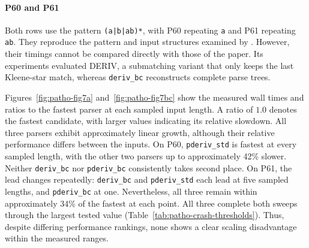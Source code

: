 %
%
%



\paragraph{P60 and P61}
Both rows use the pattern \texttt{(a|b|ab)*},
with P60 repeating \texttt{a} and P61 repeating \texttt{ab}.
They reproduce the pattern and input structures
examined by \citet[Figs.~7(a) and 7(b)]{sulzmannlu2014}.
However, their timings cannot be compared directly
with those of the paper.
Its experiments evaluated DERIV, a submatching variant
that only keeps the last Kleene-star match,
whereas \texttt{deriv\_bc} reconstructs complete parse trees.

Figures~\ref{fig:patho-fig7a}
and~\ref{fig:patho-fig7bc} show the measured
wall times and ratios to the fastest parser
at each sampled input length.
A ratio of $1.0$ denotes the fastest candidate,
with larger values indicating its relative slowdown.
All three parsers exhibit approximately linear
growth, although their relative performance
differs between the inputs.
On P60, \texttt{pderiv\_std} is fastest at every
sampled length, with the other two parsers
up to approximately 42\% slower.
Neither \texttt{deriv\_bc} nor \texttt{pderiv\_bc}
consistently takes second place.
On P61, the lead changes repeatedly:
\texttt{deriv\_bc} and \texttt{pderiv\_std}
each lead at five sampled lengths,
and \texttt{pderiv\_bc} at one.
Nevertheless, all three remain within
approximately 34\% of the fastest at each point.
All three complete both sweeps through the
largest tested value
(Table~\ref{tab:patho-crash-thresholds}).
Thus, despite differing performance rankings,
none shows a clear scaling disadvantage
within the measured ranges.

%
%
%

